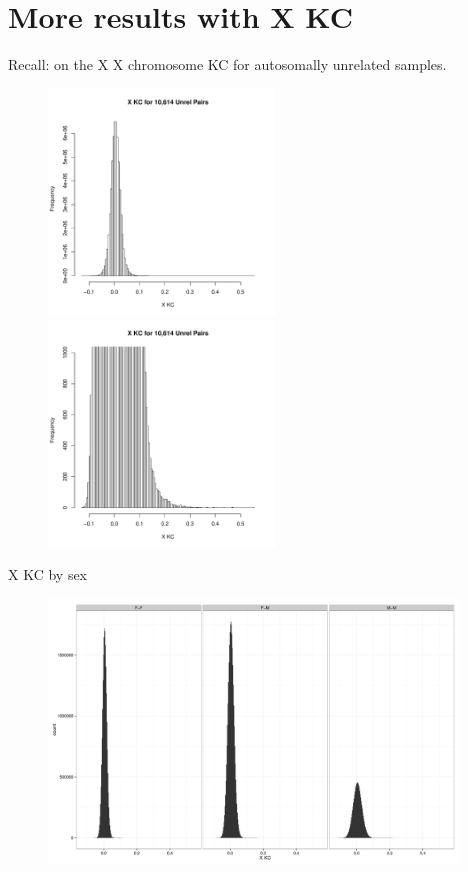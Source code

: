 \documentclass{beamer}
\begin{document}
\section[]{More results with X KC}
\begin{frame}{Recall: on the X}
X chromosome KC for autosomally unrelated samples.
\begin{figure}
\includegraphics[height=6cm]{../xkc_unrel_hist.pdf}
\includegraphics[height=6cm]{../xkc_unrel_hist_trunc.pdf}
\end{figure}
\end{frame}

\begin{frame}{X KC by sex}
\begin{figure}
\includegraphics[height=7cm]{../olga_update_27july2015/xkc_unrel_hist_bySexPair.pdf}
\end{figure}
\end{frame}
\end{document}

